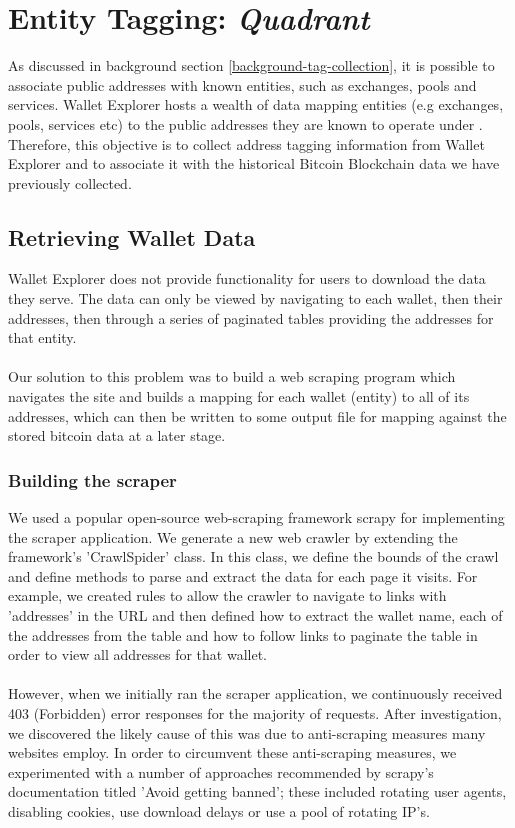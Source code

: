 \chapter{Entity Tagging: \textit{Quadrant}}\label{section-entity-tagging}
As discussed in background section \ref{background-tag-collection}, it is possible to associate public addresses with known entities, such as exchanges, pools and services. Wallet Explorer hosts a wealth of data mapping entities (e.g exchanges, pools, services etc) to the public addresses they are known to operate under \cite{RefWorks:doc:5c4b26f3e4b0ea619646d513}. Therefore, this objective is to collect address tagging information from Wallet Explorer and to associate it with the historical Bitcoin Blockchain data we have previously collected.

\section{Retrieving Wallet Data}\label{design:fetch-entity-data}
Wallet Explorer does not provide functionality for users to download the data they serve. The data can only be viewed by navigating to each wallet, then their addresses, then through a series of paginated tables providing the addresses for that entity.
\\\\
Our solution to this problem was to build a web scraping program which navigates the site and builds a mapping for each wallet (entity) to all of its addresses, which can then be written to some output file for mapping against the stored bitcoin data at a later stage. 

\subsection{Building the scraper}
We used a popular open-source web-scraping framework scrapy for implementing the scraper application. We generate a new web crawler by extending the framework's 'CrawlSpider' class. In this class, we define the bounds of the crawl and define methods to parse and extract the data for each page it visits. For example, we created rules to allow the crawler to navigate to links with 'addresses' in the URL and then defined how to extract the wallet name,  each of the addresses from the table and how to follow links to paginate the table in order to view all addresses for that wallet. 
\\\\
However, when we initially ran the scraper application, we continuously received 403 (Forbidden) error responses for the majority of requests.  After investigation, we discovered the likely cause of this was due to anti-scraping measures many websites employ. In order to circumvent these anti-scraping measures, we experimented with a number of approaches recommended by scrapy's documentation titled 'Avoid getting banned'; these included rotating user agents, disabling cookies, use download delays or use a pool of rotating IP's. 

